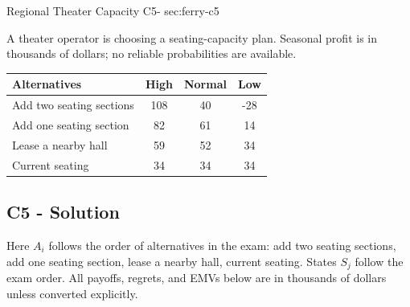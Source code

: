 \sectionScored
	{Regional Theater Capacity}
	{C5-}
	{sec:ferry-c5}
	{
	A theater operator is choosing a seating-capacity plan. Seasonal profit is in thousands of dollars; no reliable probabilities are available.
		\begin{center}\setlength{\tabcolsep}{2pt}\renewcommand{\arraystretch}{1.1}
			\begin{tabular}{lccc}\toprule
			Alternatives & High & Normal & Low\\ \midrule
			Add two seating sections&108&40&-28\\
			Add one seating section&82&61&14\\
			Lease a nearby hall&59&52&34\\
			Current seating&34&34&34\\ \bottomrule
			\end{tabular}
		\end{center}


	\label{subsec:ferry-c5-solution}
	\subsection*{C5 - Solution }

	Here $A_i$ follows the order of alternatives in the exam: add two seating sections, add one seating section, lease a nearby hall, current seating. States $S_j$ follow the exam order. All payoffs, regrets, and EMVs below are in thousands of dollars unless converted explicitly.

}
